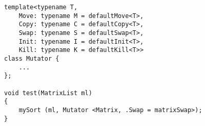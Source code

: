 \begin{lstlisting}[style=styleCXX]
template<typename T,
	Move: typename M = defaultMove<T>,
	Copy: typename C = defaultCopy<T>,
	Swap: typename S = defaultSwap<T>,
	Init: typename I = defaultInit<T>,
	Kill: typename K = defaultKill<T>>
class Mutator {
	...
};

void test(MatrixList ml)
{
	mySort (ml, Mutator <Matrix, .Swap = matrixSwap>);
}
\end{lstlisting}









































